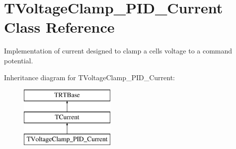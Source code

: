 \hypertarget{class_t_voltage_clamp___p_i_d___current}{\section{T\+Voltage\+Clamp\+\_\+\+P\+I\+D\+\_\+\+Current Class Reference}
\label{class_t_voltage_clamp___p_i_d___current}
}


Implementation of current designed to clamp a cells voltage to a command potential.  


Inheritance diagram for T\+Voltage\+Clamp\+\_\+\+P\+I\+D\+\_\+\+Current\+:\begin{figure}[H]
\begin{center}
\leavevmode
\includegraphics[height=3.000000cm]{class_t_voltage_clamp___p_i_d___current}
\end{center}
\end{figure}
